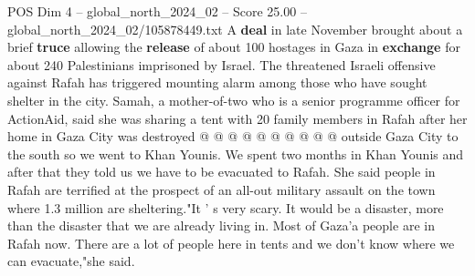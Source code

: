 \begin{textsample}{POS Dim 4 – global\_north\_2024\_02 – Score 25.00 – global\_north\_2024\_02/105878449.txt}
A \textbf{deal} in late November brought about a brief \textbf{truce} allowing the \textbf{release} of about 100 hostages in Gaza in \textbf{exchange} for about 240 Palestinians imprisoned by Israel.
The threatened Israeli offensive against Rafah has triggered mounting alarm among those who have sought shelter in the city.
Samah, a mother-of-two who is a senior programme officer for ActionAid, said she was sharing a tent with 20 family members in Rafah after her home in Gaza City was destroyed @ @ @ @ @ @ @ @ @ @ outside Gaza City to the south so we went to Khan Younis.
We spent two months in Khan Younis and after that they told us we have to be evacuated to Rafah.
She said people in Rafah are terrified at the prospect of an all-out military assault on the town where 1.3 million are sheltering."It ' s very scary.
It would be a disaster, more than the disaster that we are already living in.
Most of Gaza'a people are in Rafah now.
There are a lot of people here in tents and we don't know where we can evacuate,"she said.

\end{textsample}
